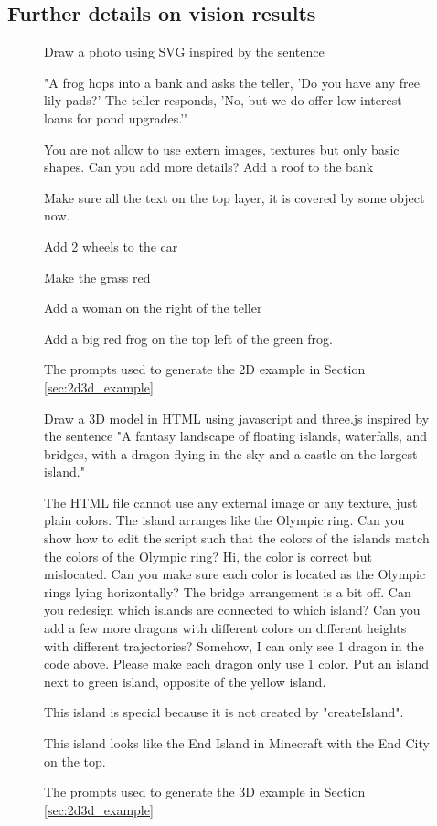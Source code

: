 \subsection{Further details on vision results}\label{sec:visionappendix}

\begin{figure}
\begin{AIbox}{\DV}
Draw a photo using SVG inspired by the sentence

"A frog hops into a bank and asks the teller, 'Do you have any free lily pads?' The teller responds, 'No, but we do offer low interest loans for pond upgrades.'"

You are not allow to use extern images, textures but only basic shapes.
\tcbline
Can you add more details?
\tcbline
Add a roof to the bank

Make sure all the text on the top layer, it is covered by some object now.

Add 2 wheels to the car

Make the grass red

Add a woman on the right of the teller

Add a big red frog on the top left of the green frog.
\end{AIbox}
\caption{The prompts used to generate the 2D example in Section \ref{sec:2d3d_example}}\label{fig:2dprompt}
\end{figure}

\begin{figure}[H]
\begin{AIbox}{\DV}
Draw a 3D model in HTML using javascript and three.js inspired by the sentence "A fantasy landscape of floating islands, waterfalls, and bridges, with a dragon flying in the sky and a castle on the largest island."

The HTML file cannot use any external image or any texture, just plain colors.
\tcbline
The island arranges like the Olympic ring. Can you show how to edit the script such that the colors of the islands match the colors of the Olympic ring?
\tcbline
Hi, the color is correct but mislocated. Can you make sure each color is located as the Olympic rings lying horizontally?
\tcbline
The bridge arrangement is a bit off. Can you redesign which islands are connected to which island?
\tcbline
Can you add a few more dragons with different colors on different heights with different trajectories?
\tcbline
Somehow, I can only see 1 dragon in the code above.
\tcbline
Please make each dragon only use 1 color.
\tcbline
Put an island next to green island, opposite of the yellow island.

This island is special because it is not created by "createIsland".

This island looks like the End Island in Minecraft with the End City on the top.
\end{AIbox}
\caption{The prompts used to generate the 3D example in Section \ref{sec:2d3d_example}}\label{fig:3dprompt}
\end{figure}


